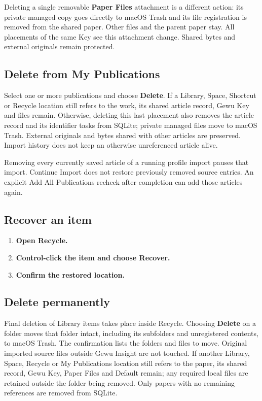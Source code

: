 \documentclass[10pt,letterpaper,oneside]{scrreprt}
\providecommand{\tightlist}{\setlength{\itemsep}{1pt}\setlength{\parskip}{0pt}}
\begin{document}
Deleting a single removable \textbf{Paper Files} attachment is a different action: its private managed copy goes directly to macOS Trash and its file registration is removed from the shared paper. Other files and the parent paper stay. All placements of the same Key see this attachment change. Shared bytes and external originals remain protected.

\subsection{Delete from My Publications}\label{delete-from-my-publications}

Select one or more publications and choose \textbf{Delete}. If a Library, Space, Shortcut or Recycle location still refers to the work, its shared article record, Gewu Key and files remain. Otherwise, deleting this last placement also removes the article record and its identifier tasks from SQLite; private managed files move to macOS Trash. External originals and bytes shared with other articles are preserved. Import history does not keep an otherwise unreferenced article alive.

Removing every currently saved article of a running profile import pauses that import. Continue Import does not restore previously removed source entries. An explicit Add All Publications recheck after completion can add those articles again.

\subsection{Recover an item}\label{recover-an-item}

\begin{enumerate}
\tightlist
\item
  \textbf{Open \textbf{Recycle}.}
\item
  \textbf{Control-click the item and choose \textbf{Recover}.}
\item
  \textbf{Confirm the restored location.}
\end{enumerate}

\subsection{Delete permanently}\label{delete-permanently}

Final deletion of Library items takes place inside Recycle. Choosing \textbf{Delete} on a folder moves that folder intact, including its subfolders and unregistered contents, to macOS Trash. The confirmation lists the folders and files to move. Original imported source files outside Gewu Insight are not touched. If another Library, Space, Recycle or My Publications location still refers to the paper, its shared record, Gewu Key, Paper Files and Default remain; any required local files are retained outside the folder being removed. Only papers with no remaining references are removed from SQLite.
\end{document}
